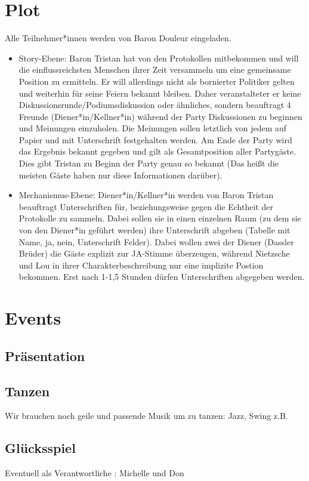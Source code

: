 \documentclass[12pt, a4paper, openany]{report}
\begin{document}
\chapter{Plot}
Alle Teilnehmer*innen werden von Baron Douleur eingeladen.
\begin{itemize}
	\item Story-Ebene: Baron Tristan hat von den Protokollen mitbekommen und will die einflussreichsten Menschen ihrer Zeit versammeln um eine gemeinsame Position zu ermitteln. 
    Er will allerdings nicht als bornierter Politiker gelten und weiterhin für seine Feiern bekannt bleiben. Daher veranstalteter er keine Diskussionsrunde/Podiumsdiskussion oder ähnliches, sondern beauftragt 4 Freunde (Diener*in/Kellner*in) während der Party Diskussionen zu beginnen und Meinungen einzuholen. Die Meinungen sollen letztlich von jedem auf Papier und mit Unterschrift festgehalten werden. Am Ende der Party wird das Ergebnis bekannt gegeben und gilt als Gesamtposition aller Partygäste. Dies gibt Tristan zu Beginn der Party genau so bekannt (Das heißt die meisten Gäste haben nur diese Informationen darüber). 
	\item Mechanismus-Ebene: Diener*in/Kellner*in werden von Baron Tristan beauftragt Unterschriften für, beziehungsweise gegen die Echtheit der Protokolle zu sammeln. Dabei sollen sie in einen einzelnen Raum (zu dem sie von den Diener*in geführt werden) ihre Unterschrift abgeben (Tabelle mit Name, ja, nein, Unterschrift Felder). Dabei wollen zwei der Diener (Dassler Brüder) die Gäste explizit zur JA-Stimme überzeugen, während Nietzsche und Lou in ihrer Charakterbeschreibung nur eine implizite Postion bekommen. Erst nach 1-1,5 Stunden dürfen Unterschriften abgegeben werden. 

\end{itemize}


\chapter{Events}
\section{Präsentation}
\section{Tanzen}
Wir brauchen noch geile und passende Musik um zu tanzen:
Jazz, Swing z.B.

\section{Glücksspiel}
Eventuell als Verantwortliche : Michelle und Don
\end{document}

